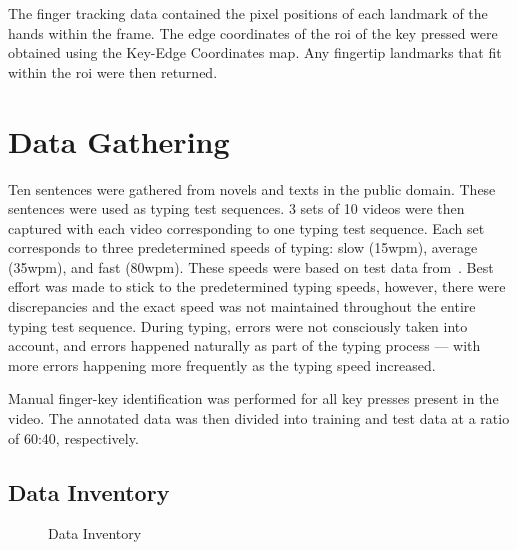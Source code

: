 \documentclass[preprint,12pt,authoryear]{elsarticle}
\begin{document}
The finger tracking data contained the pixel positions of each landmark of the
hands within the frame. The edge coordinates of the \ac{roi} of the key pressed
were obtained using the Key-Edge Coordinates map. Any fingertip landmarks that
fit within the \ac{roi} were then returned.

\section{Data Gathering}
Ten sentences were gathered from novels and texts in the public domain. These
sentences were used as typing test sequences. 3 sets of 10 videos were then
captured with each video corresponding to one typing test sequence. Each set
corresponds to three predetermined speeds of typing: slow (15wpm), average
(35wpm), and fast (80wpm). These speeds were based on test data
from~\citet{keybr}. Best effort was made to stick to the predetermined typing
speeds, however, there were discrepancies and the exact speed was not maintained
throughout the entire typing test sequence. During typing, errors were not
consciously taken into account, and errors happened naturally as part of the
typing process --- with more errors happening more frequently as the typing
speed increased.

Manual finger-key identification was performed for all key presses present in
the video. The annotated data was then divided into training and test data at a
ratio of 60:40, respectively.

\subsection{Data Inventory}

\begin{figure}[H]
	\caption{Data Inventory}
	\label{fig:metho-inventory-training}
\end{figure}
\end{document}
